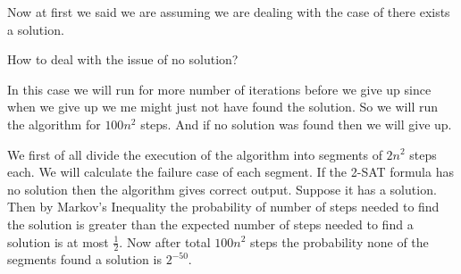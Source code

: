 Now at first we said we are assuming we are dealing with the case of there exists a solution. 
\begin{question}{}{}
	How to deal with the issue of no solution?
\end{question}
In this case we will run for more number of iterations before we give up since when we give up we me might just not have found the solution. So we will run the algorithm for $100n^2$ steps. And if no solution was found then we will give up. 

We first of all divide the execution of the algorithm into segments of $2n^2$ steps each. We will calculate the failure case of each segment. If the 2-SAT formula has no solution then the algorithm gives correct output. Suppose it has a solution. Then by Markov's Inequality the probability of number of steps needed to find the solution is greater than the expected number of steps needed to find a solution is at most $\frac12$. Now after total $100n^2$ steps the probability none of the segments found a solution is $2^{-50}$.